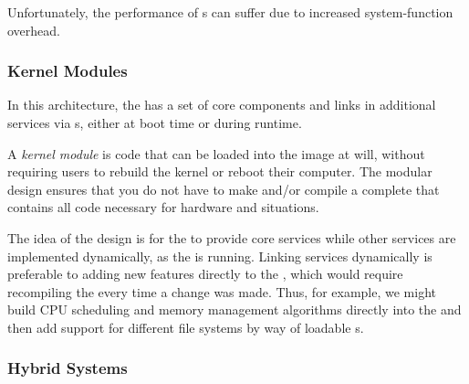 Unfortunately, the performance of s can suffer due to increased system-function overhead.

\subsubsection{Kernel Modules}\label{subsubsec:Kernel_Modules}
In this architecture, the  has a set of core components and links in additional services via s, either at boot time or during runtime.

\begin{definition}\label{def:Kernel_Module}
  A \emph{kernel module} is code that can be loaded into the  image at will, without requiring users to rebuild the kernel or reboot their computer.
  The modular design ensures that you do not have to make and/or compile a complete  that contains all code necessary for hardware and situations.
\end{definition}

The idea of the design is for the  to provide core services while other services are implemented dynamically, as the  is running.
Linking services dynamically is preferable to adding new features directly to the , which would require recompiling the  every time a change was made.
Thus, for example, we might build CPU scheduling and memory management algorithms directly into the  and then add support for different file systems by way of loadable s.

\subsubsection{Hybrid Systems}\label{subsubsec:Hybrid_Systems}

